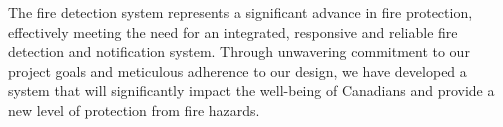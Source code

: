 The fire detection system represents a significant advance in fire protection, effectively meeting the need for an
integrated, responsive and reliable fire detection and notification system. Through unwavering
commitment to our project goals and meticulous adherence to our design, we have developed a system that will
significantly impact the well-being of Canadians and provide a new level of protection from fire hazards. 
